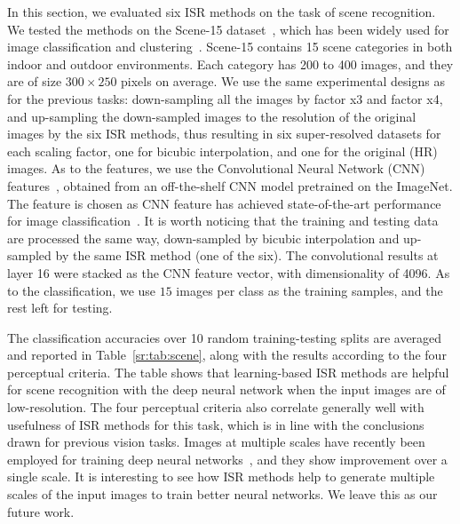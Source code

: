 In this section, we evaluated six ISR methods on the task of scene recognition. 
We tested the methods on the Scene-15 dataset~\citep{scene-15}, which has been widely 
used for image classification and clustering~\citep{scene-15, dai:eccv12b, dai:iccv13b}. 
Scene-15 contains 15
scene categories in both indoor and outdoor environments. Each category has 200
to 400 images, and they are of size $300 \times 250$ pixels on average.
We use the same experimental designs as for the previous tasks:  down-sampling all the images by 
factor x3 and factor x4, and up-sampling the down-sampled images to the
resolution of the original images by the six ISR methods, thus resulting in six super-resolved datasets 
for each scaling factor, one for bicubic interpolation, and one for the original (HR) images.  
As to the features, we use the  Convolutional Neural Network (CNN) features~\citep{deep:bmvc14}, 
obtained from an off-the-shelf CNN model pretrained on the ImageNet. The feature is  chosen as CNN 
feature has achieved state-of-the-art performance for image
classification~\citep{deep:bmvc14}. It is worth noticing that the training and testing data are processed 
the same way, \ie down-sampled by bicubic interpolation and up-sampled by the same ISR method (one of the six).  
The convolutional results at layer 16 were
stacked as the CNN feature vector, with dimensionality of
4096.  As to the classification, we use $15$ images per class as the training samples, and the rest left for testing. 

The classification accuracies over 10 random training-testing splits are averaged and reported in Table~\ref{sr:tab:scene}, along with the results according to the four perceptual criteria.  
The table shows that learning-based ISR methods are helpful for scene 
recognition with the deep neural network when the input images are of low-resolution. 
The four perceptual criteria also correlate 
generally well with usefulness of ISR methods for this task, 
which is in line with the conclusions drawn for previous vision tasks.   
Images at multiple scales have recently been employed for training deep 
neural networks~\citep{cnn:multi-scale, Long_2015_CVPR},  and 
they show improvement over a single scale.  It is interesting to 
see how ISR methods help to generate multiple scales of the input images to train 
better neural networks. We leave this as our future work. 




